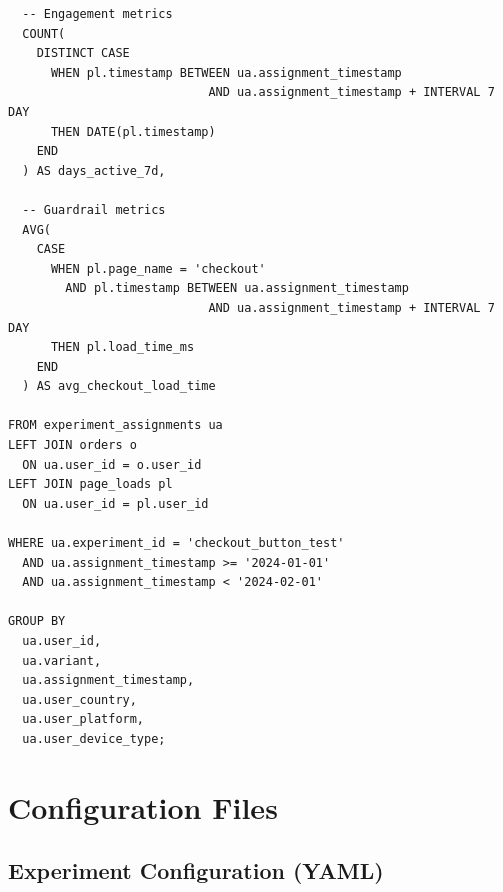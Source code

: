 \begin{lstlisting}
  -- Engagement metrics
  COUNT(
    DISTINCT CASE
      WHEN pl.timestamp BETWEEN ua.assignment_timestamp
                            AND ua.assignment_timestamp + INTERVAL 7 DAY
      THEN DATE(pl.timestamp)
    END
  ) AS days_active_7d,

  -- Guardrail metrics
  AVG(
    CASE
      WHEN pl.page_name = 'checkout'
        AND pl.timestamp BETWEEN ua.assignment_timestamp
                            AND ua.assignment_timestamp + INTERVAL 7 DAY
      THEN pl.load_time_ms
    END
  ) AS avg_checkout_load_time

FROM experiment_assignments ua
LEFT JOIN orders o
  ON ua.user_id = o.user_id
LEFT JOIN page_loads pl
  ON ua.user_id = pl.user_id

WHERE ua.experiment_id = 'checkout_button_test'
  AND ua.assignment_timestamp >= '2024-01-01'
  AND ua.assignment_timestamp < '2024-02-01'

GROUP BY
  ua.user_id,
  ua.variant,
  ua.assignment_timestamp,
  ua.user_country,
  ua.user_platform,
  ua.user_device_type;
\end{lstlisting}

\newpage

\section{Configuration Files}

\subsection{Experiment Configuration (YAML)}


